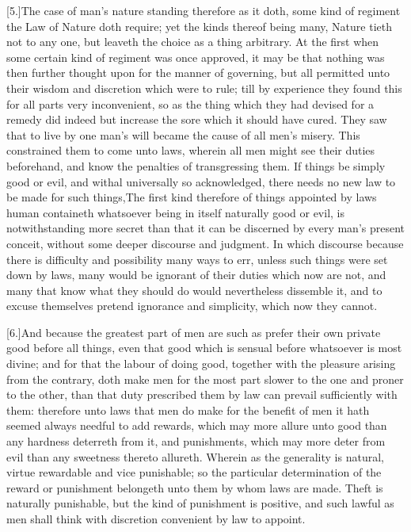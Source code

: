 [5.]The case of man’s nature standing therefore as it doth, some kind of regiment the Law of Nature doth require; yet the kinds thereof being many, Nature tieth not to any one, but leaveth the choice as a thing arbitrary. At the first when some certain kind of regiment was once approved, it may be that nothing was then further thought upon for the manner of governing, but all permitted unto their wisdom and discretion which were to rule; till by experience they found this for all parts very inconvenient, so as the thing which they had devised for a remedy did indeed but increase the sore which it should have cured. They saw that to live by one man’s will became the cause of all men’s misery. This constrained  them to come unto laws, wherein all men might see their duties beforehand, and know the penalties of transgressing them. If things be simply good or evil, and withal universally so acknowledged, there needs no new law to be made for such things,The first kind therefore of things appointed by laws human containeth whatsoever being in itself naturally good or evil, is notwithstanding more secret than that it can be discerned by every man’s present conceit, without some deeper discourse and judgment. In which discourse because there is difficulty and possibility many ways to err, unless such things were set down by laws, many would be ignorant of their duties which now are not, and many that know what they should do would nevertheless dissemble it, and to excuse themselves pretend ignorance and simplicity, which now they cannot.

[6.]And because the greatest part of men are such as prefer their own private good before all things, even that good which is sensual before whatsoever is most divine; and for that the labour of doing good, together with the pleasure arising from the contrary, doth make men for the most part slower to the one and proner to the other, than that duty prescribed them by law can prevail sufficiently with them: therefore unto laws that men do make for the benefit of men it hath seemed always needful to add rewards, which may more allure unto good than any hardness deterreth from it, and punishments, which may more deter from evil than any sweetness thereto allureth. Wherein as the generality is natural, virtue rewardable and vice punishable; so the particular determination of the reward or punishment belongeth unto them by whom laws are made. Theft is naturally punishable, but the kind of punishment is positive, and such lawful as men shall think with discretion convenient by law to appoint.

